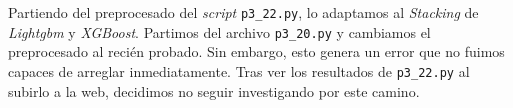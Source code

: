 \documentclass[a4paper, 20pt]{article}
\begin{document}
Partiendo del preprocesado del \textit{script} \texttt{p3\_22.py}, lo adaptamos al \textit{Stacking} de \textit{Lightgbm} y \textit{XGBoost}. Partimos del archivo \texttt{p3\_20.py} y cambiamos el preprocesado al recién probado. Sin embargo, esto genera un error que no fuimos capaces de arreglar inmediatamente. Tras ver los resultados de \texttt{p3\_22.py} al subirlo a la web, decidimos no seguir investigando por este camino.


\printbibliography[heading=bibintoc]
\end{document}
